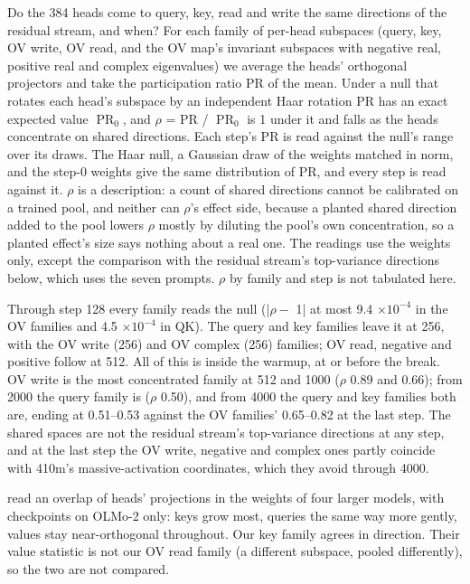 \documentclass[11pt]{article}
\begin{document}
Do the 384 heads come to query, key, read and write the same directions of the residual stream, and when? For each family of per-head subspaces (query, key, OV write, OV read, and the OV map's invariant subspaces with negative real, positive real and complex eigenvalues) we average the heads' orthogonal projectors and take the participation ratio PR of the mean. Under a null that rotates each head's subspace by an independent Haar rotation PR has an exact expected value $\operatorname{PR}_{0}$, and $\rho $ = PR / $\operatorname{PR}_{0}$ is 1 under it and falls as the heads concentrate on shared directions. Each step's PR is read against the null's range over its draws. The Haar null, a Gaussian draw of the weights matched in norm, and the step-0 weights give the same distribution of PR, and every step is read against it. $\rho $ is a description: a count of shared directions cannot be calibrated on a trained pool, and neither can $\rho $'s effect side, because a planted shared direction added to the pool lowers $\rho $ mostly by diluting the pool's own concentration, so a planted effect's size says nothing about a real one. The readings use the weights only, except the comparison with the residual stream's top-variance directions below, which uses the seven prompts. $\rho $ by family and step is not tabulated here.

Through step 128 every family reads the null (|$\rho -$ 1| at most 9.4 $\times 10^{-4}$ in the OV families and 4.5 $\times 10^{-4}$ in QK). The query and key families leave it at 256, with the OV write (256) and OV complex (256) families; OV read, negative and positive follow at 512. All of this is inside the warmup, at or before the break. OV write is the most concentrated family at 512 and 1000 ($\rho $ 0.89 and 0.66); from 2000 the query family is ($\rho $ 0.50), and from 4000 the query and key families both are, ending at 0.51--0.53 against the OV families' 0.65--0.82 at the last step. The shared spaces are not the residual stream's top-variance directions at any step, and at the last step the OV write, negative and complex ones partly coincide with 410m's massive-activation coordinates, which they avoid through 4000.

\citet{shaikh2026} read an overlap of heads' projections in the weights of four larger models, with checkpoints on OLMo-2 only: keys grow most, queries the same way more gently, values stay near-orthogonal throughout. Our key family agrees in direction. Their value statistic is not our OV read family (a different subspace, pooled differently), so the two are not compared.
\end{document}
